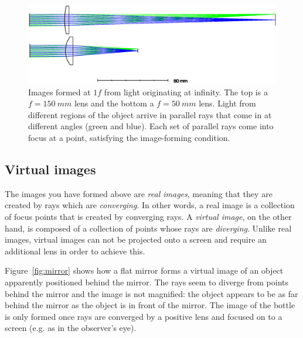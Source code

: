 \documentclass[a4paper]{report}
\begin{document}
    \begin{figure}[h]
    \center
    \includegraphics[width=6in]{figures/lens_f_comparison.eps}
    \caption{Images formed at $1f$ from light originating at infinity.
    The top is a $f=150~mm$ lens and the bottom a $f=50~mm$ lens.
    Light from different regions of the object arrive in parallel rays that come in at different angles (green and blue).
    Each set of parallel rays come into focus at a point, satisfying the image-forming condition. }
    \label{fig:outside}
    \end{figure}


    \subsection{Virtual images}
    \hypertarget{hintBack-virtual}{}
    The images you have formed above are \emph{real images}, meaning that they are created by rays which are \emph{converging}.
    In other words, a real image is a collection of focus points that is created by converging rays.
    A \emph{virtual image}, on the other hand, is composed of a collection of points whose rays are \emph{diverging}.
    Unlike real images, virtual images can not be projected onto a screen and require an additional lens in order to achieve this.

    Figure~\ref{fig:mirror} shows how a flat mirror forms a virtual image of an object apparently positioned behind the mirror.
    The rays seem to diverge from points behind the mirror and the image is not magnified: the object appears to be as far behind the mirror as the object is in front of the mirror.
    The image of the bottle is only formed once rays are converged by a positive lens and focused on to a screen (e.g. as in the observer's eye).
\end{document}
